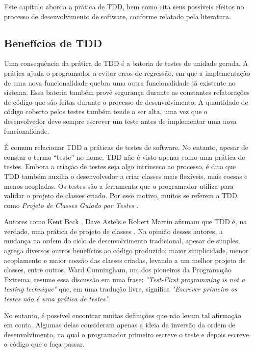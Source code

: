 \documentclass[conference]{IEEEtran}
\begin{document}
Este capítulo aborda a prática de TDD, bem como cita
seus possíveis efeitos no processo de desenvolvimento de software, conforme relatado pela
literatura.

\subsection{Benefícios de TDD}

Uma consequência da prática de TDD é a bateria de testes de unidade gerada.
A prática ajuda o programador a evitar erros de regressão, em que a implementação de
uma nova funcionalidade quebra uma outra funcionalidade já existente no sistema.
Essa bateria também provê segurança durante as
constantes refatorações de código que são feitas durante o processo de
desenvolvimento.
A quantidade de código coberto pelos testes também tende a ser alta, uma vez que o
desenvolvedor deve sempre escrever um teste antes de implementar uma nova
funcionalidade. 

É comum relacionar TDD a práticas de testes de software. No entanto, apesar de constar o
termo ``teste'' no nome, TDD não é visto apenas como uma prática de testes.
Embora a criação de testes seja algo intrínseco ao processo, é dito que TDD também 
auxilia o desenvolvedor a criar classes mais flexíveis, mais coesas e
menos acopladas. Os testes são a ferramenta que o programador utiliza para
validar o projeto de classes criado. Por esse motivo, muitos se referem a TDD como
\textit{Projeto de Classes Guiado por Testes} \cite{tdd-taxonomy}.

Autores como Kent Beck \cite{aim-fire}, Dave Astels \cite{astels-tdd} e
Robert Martin \cite{bob-martin} afirmam que TDD é, na verdade, uma prática de
projeto de classes \cite{tdd-taxonomy} \cite{aim-fire}.
Na opinião desses autores, a mudança na ordem do ciclo de
desenvolvimento tradicional, apesar de simples, agrega diversos outros
benefícios ao código produzido: maior simplicidade, menor acoplamento e maior
coesão das classes criadas, levando a um melhor projeto de classes, entre
outros. Ward Cunningham, um dos pioneiros da Programação Extrema, resume essa 
discussão em uma frase: \textit{"Test-First programming is not a testing technique"} 
que, em uma tradução livre, significa \textit{"Escrever primeiro os testes
não é uma prática de testes"}.

No entanto, é possível encontrar muitas definições que
não levam tal afirmação em conta. Algumas delas consideram apenas a ideia da
inversão da ordem de desenvolvimento, na qual o programador primeiro
escreve o teste e depois escreve o código que o faça passar.
\end{document}
